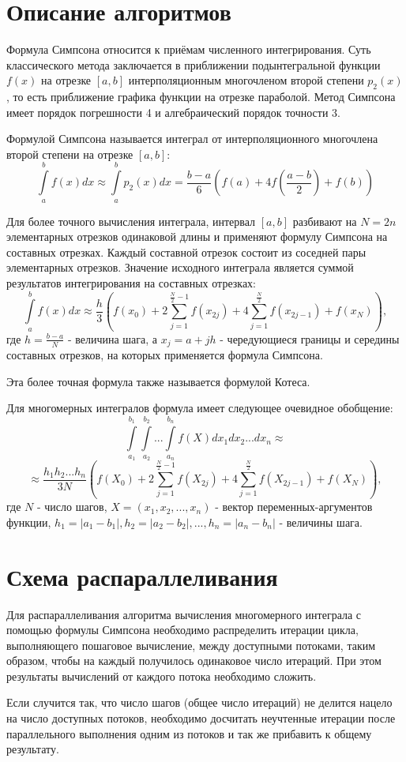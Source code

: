 \documentclass{report}
\begin{document}
\section*{Описание алгоритмов}
Формула Симпсона относится к приёмам численного интегрирования. Суть классического метода заключается в приближении подынтегральной функции $f(x)$ на отрезке $[a, b]$ интерполяционным многочленом второй степени $p_{2}(x)$, то есть приближение графика функции на отрезке параболой. Метод Симпсона имеет порядок погрешности 4 и алгебраический порядок точности 3.
\par Формулой Симпсона называется интеграл от интерполяционного многочлена второй степени на отрезке $[a, b]$:
$$
    \int\limits_a^b {f(x) dx} \approx \int\limits_a^b {p_2(x) dx} = \frac{b - a}{6} \left( f(a) + 4f \left( \frac{a - b}{2} \right) + f(b) \right)
$$
\par Для более точного вычисления интеграла, интервал $[a, b]$ разбивают на $N = 2n$ элементарных отрезков одинаковой длины и применяют формулу Симпсона на составных отрезках. Каждый составной отрезок состоит из соседней пары элементарных отрезков. Значение исходного интеграла является суммой результатов интегрирования на составных отрезках:
$$
    \int\limits_a^b {f(x) dx} \approx \frac{h}{3} \left( f(x_0) + 2 \sum_{j = 1}^{\frac{N}{2} - 1} f(x_{2j}) + 4 \sum_{j = 1}^{\frac{N}{2}} f(x_{2j - 1})+ f(x_N) \right) ,
$$
где $h = \frac{b - a}{N}$ - величина шага, а $x_j = a + jh$ - чередующиеся границы и середины составных отрезков, на которых применяется формула Симпсона.
\par Эта более точная формула также называется формулой Котеса.
\par Для многомерных интегралов формула имеет следующее очевидное обобщение:
$$
    \int\limits_{a_1}^{b_1} \int\limits_{a_2}^{b_2} ... \int\limits_{a_n}^{b_n} {f(X) dx_1 dx_2 ... dx_n} \approx
$$$$
    \approx \frac{h_1 h_2 ... h_n}{3N} \left( f(X_0) + 2 \sum_{j = 1}^{\frac{N}{2} - 1} f(X_{2j}) + 4 \sum_{j = 1}^{\frac{N}{2}} f(X_{2j - 1})+ f(X_N) \right) ,
$$
где $N$ - число шагов, $X = (x_1, x_2, ..., x_n)$ - вектор переменных-аргументов функции, $h_1 = |a_1 - b_1|, h_2 = |a_2 - b_2|, ... , h_n = |a_n - b_n|$ - величины шага.
\newpage

\section*{Схема распараллеливания}
Для распараллеливания алгоритма вычисления многомерного интеграла с помощью формулы Симпсона необходимо распределить итерации цикла, выполняющего пошаговое вычисление, между доступными потоками, таким образом, чтобы на каждый получилось одинаковое число итераций. При этом результаты вычислений от каждого потока необходимо сложить.
\par Если случится так, что число шагов (общее число итераций) не делится нацело на число доступных потоков, необходимо досчитать неучтенные итерации после параллельного выполнения одним из потоков и так же прибавить к общему результату.
\newpage
\end{document}
